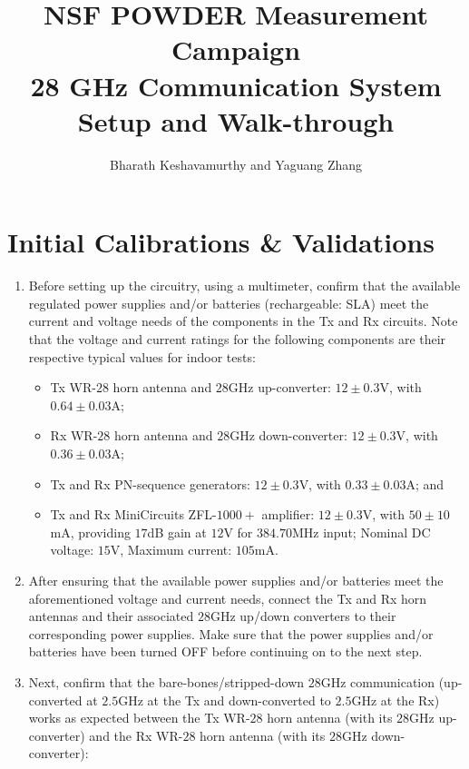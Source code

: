 \documentclass[12pt, draftcls, onecolumn]{IEEEtran}
\begin{document}
 
\title{NSF POWDER Measurement Campaign\\ \Large{28 GHz Communication System Setup and Walk-through}}
\author{Bharath Keshavamurthy and Yaguang Zhang}
\maketitle
{}
\section{Initial Calibrations \& Validations}\label{I}
\begin{enumerate}
    \item Before setting up the circuitry, using a multimeter, confirm that the available regulated power supplies and/or batteries (rechargeable: SLA) meet the current and voltage needs of the components in the Tx and Rx circuits. Note that the voltage and current ratings for the following components are their respective typical values for indoor tests:
    \begin{itemize}
        \item Tx WR-$28$ horn antenna and $28$GHz up-converter: $12{\pm}0.3$V, with $0.64{\pm}0.03$A;
        \item Rx WR-$28$ horn antenna and $28$GHz down-converter: $12{\pm}0.3$V, with $0.36{\pm}0.03$A;
        \item \label{step:1p} Tx and Rx PN-sequence generators: $12{\pm}0.3$V, with $0.33{\pm}0.03$A; and
        \item Tx and Rx MiniCircuits ZFL-$1000+$ amplifier: $12{\pm}0.3$V, with $50{\pm}10$mA, providing $17$dB gain at $12$V for $384.70$MHz input; Nominal DC voltage: $15$V, Maximum current: $105$mA.
    \end{itemize}
    \item After ensuring that the available power supplies and/or batteries meet the aforementioned voltage and current needs, connect the Tx and Rx horn antennas and their associated $28$GHz up/down converters to their corresponding power supplies. Make sure that the power supplies and/or batteries have been turned OFF before continuing on to the next step.
    \item Next, confirm that the bare-bones/stripped-down $28$GHz communication (up-converted at $2.5$GHz at the Tx and down-converted to $2.5$GHz at the Rx) works as expected between the Tx WR-$28$ horn antenna (with its $28$GHz up-converter) and the Rx WR-$28$ horn antenna (with its $28$GHz down-converter):

\end{enumerate}
\end{document}
